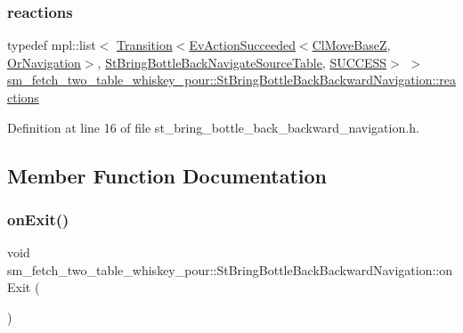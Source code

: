 \subsubsection{\texorpdfstring{reactions}{reactions}}
{\footnotesize\ttfamily typedef mpl\+::list$<$ \hyperlink{classsmacc_1_1Transition}{Transition}$<$\hyperlink{structsmacc_1_1default__events_1_1EvActionSucceeded}{Ev\+Action\+Succeeded}$<$\hyperlink{classcl__move__base__z_1_1ClMoveBaseZ}{Cl\+Move\+BaseZ}, \hyperlink{classsm__fetch__two__table__whiskey__pour_1_1OrNavigation}{Or\+Navigation}$>$, \hyperlink{structsm__fetch__two__table__whiskey__pour_1_1StBringBottleBackNavigateSourceTable}{St\+Bring\+Bottle\+Back\+Navigate\+Source\+Table}, \hyperlink{structsmacc_1_1default__transition__tags_1_1SUCCESS}{S\+U\+C\+C\+E\+SS}$>$ $>$ \hyperlink{structsm__fetch__two__table__whiskey__pour_1_1StBringBottleBackBackwardNavigation_ad58993939ee0666c179cc3bcc4a1f1fc}{sm\+\_\+fetch\+\_\+two\+\_\+table\+\_\+whiskey\+\_\+pour\+::\+St\+Bring\+Bottle\+Back\+Backward\+Navigation\+::reactions}}



Definition at line 16 of file st\+\_\+bring\+\_\+bottle\+\_\+back\+\_\+backward\+\_\+navigation.\+h.



\subsection{Member Function Documentation}
\mbox{\label{structsm__fetch__two__table__whiskey__pour_1_1StBringBottleBackBackwardNavigation_ae595cd281a621fd3d261ef246785ba11}} 
\subsubsection{\texorpdfstring{on\+Exit()}{onExit()}}
{\footnotesize\ttfamily void sm\+\_\+fetch\+\_\+two\+\_\+table\+\_\+whiskey\+\_\+pour\+::\+St\+Bring\+Bottle\+Back\+Backward\+Navigation\+::on\+Exit (\begin{DoxyParamCaption}{ }\end{DoxyParamCaption})\hspace{0.3cm}{\ttfamily [inline]}}



